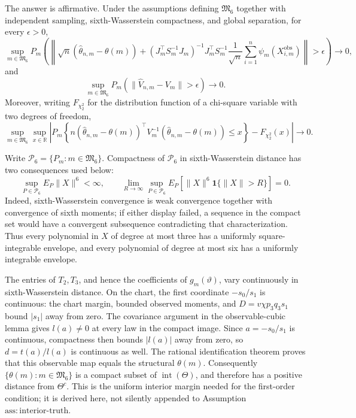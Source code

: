 The answer is affirmative. Under the assumptions defining \(\mathfrak M_6\) together with independent sampling, sixth-Wasserstein compactness, and global separation, for every \(\epsilon>0\),
\[
\sup_{m\in\mathfrak M_6}P_m\!\left(\left\|\sqrt n(\widehat\theta_{n,m}-\theta(m))+(J_m^\top S_m^{-1}J_m)^{-1}J_m^\top S_m^{-1}\frac1{\sqrt n}\sum_{i=1}^n\psi_m(X_{i,m}^{\mathrm{obs}})\right\|>\epsilon\right)\longrightarrow0,
\]
and
\[
\sup_{m\in\mathfrak M_6}P_m\!\left(\|\widehat V_{n,m}-V_m\|>\epsilon\right)\longrightarrow0.
\]
Moreover, writing \(F_{\chi^2_2}\) for the distribution function of a chi-square variable with two degrees of freedom,
\[
\sup_{m\in\mathfrak M_6}\sup_{x\in\mathbb R}
\left|P_m\!\left\{n(\widehat\theta_{n,m}-\theta(m))^\top V_m^{-1}(\widehat\theta_{n,m}-\theta(m))\le x\right\}-F_{\chi^2_2}(x)\right|\longrightarrow0.
\]

Write \(\mathcal P_6=\{P_m:m\in\mathfrak M_6\}\). Compactness of \(\mathcal P_6\) in sixth-Wasserstein distance has two consequences used below:
\[
\sup_{P\in\mathcal P_6}E_P\|X\|^6<\infty,
\qquad
\lim_{R\to\infty}\sup_{P\in\mathcal P_6}
E_P[\|X\|^6\mathbf 1\{\|X\|>R\}]=0.
\]
Indeed, sixth-Wasserstein convergence is weak convergence together with convergence of sixth moments; if either display failed, a sequence in the compact set would have a convergent subsequence contradicting that characterization. Thus every polynomial in \(X\) of degree at most three has a uniformly square-integrable envelope, and every polynomial of degree at most six has a uniformly integrable envelope.

The entries of \(T_2,T_3\), and hence the coefficients of \(g_m(\vartheta)\), vary continuously in sixth-Wasserstein distance. On the chart, the first coordinate \(-s_0/s_1\) is continuous: the chart margin, bounded observed moments, and \(D=v\chi p_3q_3s_1\) bound \(|s_1|\) away from zero. The covariance argument in the observable-cubic lemma gives \(l(a)\neq0\) at every law in the compact image. Since \(a=-s_0/s_1\) is continuous, compactness then bounds \(|l(a)|\) away from zero, so \(d=t(a)/l(a)\) is continuous as well. The rational identification theorem proves that this observable map equals the structural \(\theta(m)\). Consequently \(\{\theta(m):m\in\mathfrak M_6\}\) is a compact subset of \(\operatorname{int}(\Theta)\), and therefore has a positive distance from \(\Theta^c\). This is the uniform interior margin needed for the first-order condition; it is derived here, not silently appended to Assumption \(\mathrm{ass:interior\mbox{-}truth}\).

